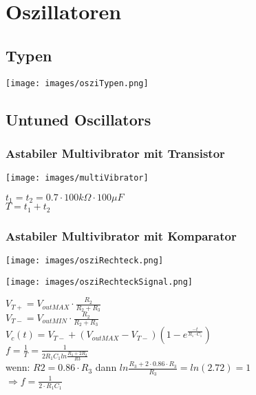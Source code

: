 \section{Oszillatoren}
\subsection{Typen}
	\begin{center}
		\texttt{[image: images/osziTypen.png]}
	\end{center}

\subsection{Untuned Oscillators}
	\subsubsection{Astabiler Multivibrator mit Transistor}
	\begin{minipage}{6cm}
		\texttt{[image: images/multiVibrator]}
	\end{minipage}
	\begin{minipage}{10cm}
		$t_1 = t_2 = 0.7 \cdot 100k\Omega \cdot 100\mu F$ \\
		$T = t_1 + t_2$
	\end{minipage}

\subsubsection{Astabiler Multivibrator mit Komparator}
	\begin{multicols}{3}
		\texttt{[image: images/osziRechteck.png]}
		\columnbreak
		
		\texttt{[image: images/osziRechteckSignal.png]}
		\columnbreak
		
		$V_{T+}=V_{outMAX}\cdot\frac{R_2}{R_2+R_3}$\\
		$V_{T-}=V_{outMIN}\cdot\frac{R_2}{R_2+R_3}$\\
		$V_c(t)=V_{T-}+\left(V_{outMAX}-V_{T-}\right)\left(1-e^{\frac{-t}{R_1\cdot
		C_1}}\right)$\\
		$f=\frac{1}{T}=\frac{1}{2R_1C_1 ln \frac{R_3+2R_2}{R3}}$\\
		wenn: $R2 = 0.86 \cdot R_3$ dann $ln\frac{R_3 +2 \cdot 0.86 \cdot R_3}{R_3}=ln
		\left( 2.72 \right) = 1$\\
		$\Longrightarrow f=\frac{1}{2\cdot R_1C_1}$
	\end{multicols}
